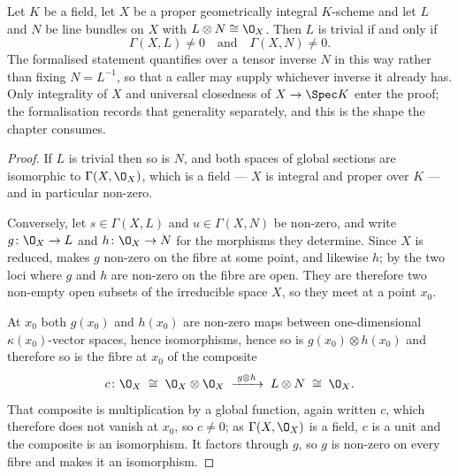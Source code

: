 \begin{lemma}\label{lem:cube-triviality-criterion}
\leanok
Let $K$ be a field, let $X$ be a proper geometrically integral $K$-scheme and
let $L$ and $N$ be line bundles on $X$ with $L\otimes N\cong\O_X$.  Then $L$ is
trivial if and only if
\[
  \Gamma(X,L)\neq0\quad\text{and}\quad\Gamma(X,N)\neq0 .
\]
The formalised statement quantifies over a tensor inverse $N$ in this way
rather than fixing $N=L^{-1}$, so that a caller may supply whichever inverse it
already has.  Only integrality of $X$ and universal closedness of $X\to\Spec K$
enter the proof; the formalisation records that generality separately, and this
is the shape the chapter consumes.
\end{lemma}
\begin{proof}
\leanok
If $L$ is trivial then so is $N$, and both spaces of global sections are
isomorphic to $\Gamma(X,\O_X)$, which is a field --- $X$ is integral and proper
over $K$ --- and in particular non-zero.

Conversely, let $s\in\Gamma(X,L)$ and $u\in\Gamma(X,N)$ be non-zero, and write
$g\colon\O_X\to L$ and $h\colon\O_X\to N$ for the morphisms they determine.
Since $X$ is reduced,  makes $g$ non-zero on
the fibre at some point, and likewise $h$; by 
the two loci where $g$ and $h$ are non-zero on the fibre are open.  They are
therefore two non-empty open subsets of the irreducible space $X$, so they meet
at a point $x_0$.

At $x_0$ both $g(x_0)$ and $h(x_0)$ are non-zero maps between one-dimensional
$\kappa(x_0)$-vector spaces, hence isomorphisms, hence so is
$g(x_0)\otimes h(x_0)$ and therefore so is the fibre at $x_0$ of the composite
\[
  c\colon\O_X\;\cong\;\O_X\otimes\O_X\;\xrightarrow{\;g\otimes h\;}\;
  L\otimes N\;\cong\;\O_X .
\]
That composite is multiplication by a global function, again written $c$, which
therefore does not vanish at $x_0$, so $c\neq0$; as $\Gamma(X,\O_X)$ is a field,
$c$ is a unit and the composite is an isomorphism.  It factors through $g$, so
$g$ is non-zero on every fibre and  makes
it an isomorphism.
\end{proof}

